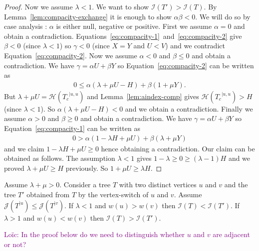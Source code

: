 \documentclass[11 pt]{modarticle}
\newcommand{\wmap}{w}
\newcommand{\rtree}[2]{{#1}^{\lvert #2}}
\newcommand{\indexsymbol}{\mathcal{I}}
\newcommand{\tindex}[1]{\indexsymbol(#1)}
\newcommand{\rindexsymbol}{\mathcal{J}}
\newcommand{\rindex}[2]{\rindexsymbol(\rtree{#2}{#1})}
\newcommand{\aindexsymbol}{\mathcal{H}}
\newcommand{\aindex}[3]{\aindexsymbol(\rtree{#3}{#1, #2})}
\newcommand{\ldcomment}[1]{\textcolor{purple}{{\footnotesize Loïc:} #1}}
\begin{document}
\begin{proof}
Now we assume $\lambda < 1$. We want to show $\tindex{T'} > \tindex{T}$. By Lemma~\ref{lem:compacity-exchange} it is enough to show $\alpha \beta < 0$. We will do so by case analysis : $\alpha$ is either null, negative or positive. First we assume $\alpha = 0$ and obtain a contradiction. Equations~\eqref{eq:compacity-1}~and~\eqref{eq:compacity-2} give $\beta < 0$ (since $\lambda < 1$) so $\gamma < 0$ (since $X = Y$ and $U < V$) and we contradict Equation~\eqref{eq:compacity-2}. Now we assume $\alpha < 0$ and $\beta \leq 0$ and obtain a contradiction. We have $\gamma = \alpha U + \beta Y$ so Equation~\eqref{eq:compacity-2} can be written as
\begin{eqnarray*}
	0 \leq \alpha (\lambda + \mu U - H) + \beta (1 + \mu Y).
\end{eqnarray*}
But $\lambda + \mu U = \aindex{u}{u}{T_c}$ and Lemma~\ref{lem:aindex-comp} gives $\aindex{u}{u}{T_c} > H$ (since $\lambda < 1$). So $\alpha (\lambda + \mu U - H) < 0$ and we obtain a contradiction. Finally we assume $\alpha > 0$ and $\beta \geq 0$ and obtain a contradiction. We have $\gamma = \alpha U + \beta Y$ so Equation~\eqref{eq:compacity-1} can be written as
\begin{eqnarray*}
	0 > \alpha (1 - \lambda H + \mu U) + \beta (\lambda + \mu Y)
\end{eqnarray*}
and we claim $1 - \lambda H + \mu U \geq 0$ hence obtaining a contradiction. Our claim can be obtained as follows. The assumption $\lambda < 1$ gives $1 - \lambda \geq 0 \geq (\lambda - 1) H$ and we proved $\lambda + \mu U \geq H$ previously. So $1 + \mu U \geq \lambda H$.
\end{proof}

\begin{prop}\label{prop:compacity-wmap}
Assume $\lambda + \mu > 0$. Consider a tree $T$ with two distinct vertices $u$ and $v$ and the tree $T'$ obtained from $T$ by the vertex-switch of $u$ and $v$. Assume $\rindex{u}{T} \leq \rindex{v}{T}$. If $\lambda < 1$ and $\wmap(u) > \wmap(v)$ then $\tindex{T} < \tindex{T'}$. If $\lambda > 1$ and $\wmap(u) < \wmap(v)$ then $\tindex{T} > \tindex{T'}$.
\end{prop}

\ldcomment{In the proof below do we need to distinguish whether $u$ and $v$ are adjacent or not?}
\end{document}
